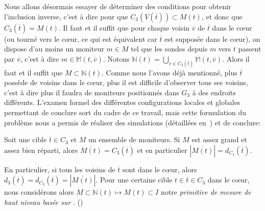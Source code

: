 Nous allons désormais essayer de déterminer des conditions pour obtenir
l'inclusion inverse, c'est à dire pour que $C_3(V(\overline{t})) \subset M(t)$,
et donc que $C_3(\overline{t}) = M(t)$. Il faut et il suffit que pour chaque
voisin $\overline{v}$ de $\overline{t}$ dans le cœur (ou tourné vers le cœur,
ce qui est équivalent car $\overline{t}$ est supposée dans le cœur), on dispose
d'au moins un moniteur $m \in M$ tel que les sondes \traceroute depuis $m$ vers
$t$ passent par $\overline{v}$, c'est à dire $m \in \mathbb{M}(t,
\overline{v})$. Notons $\mathbb{N}(t) = \bigcup_{\overline{v} \in
C_3(\overline{t})} \mathbb{M}(t, \overline{v})$. Alors il faut et il suffit que
$M \subset \mathbb{N}(t)$. Comme nous l'avons déjà mentionné, plus
$\overline{t}$ possède de voisins dans le cœur, plus il est difficile \apriori
d'observer tous ses voisins, c'est à dire plus il faudra de moniteurs
positionnés dans $G_3$ à des endroits différents. L'examen formel des
différentes configurations locales et globales permettant de conclure sort du
cadre de ce travail, mais cette formulation du problème nous a permis de
réaliser des simulations (détaillées en~) et de
conclure:

\begin{hypothese}
Soit une cible $\overline{t} \in C_3$ et $M$ un ensemble de moniteurs. Si
$M$ est assez grand et assez bien réparti, alors $\overline{M(t)} =
C_3(\overline{t})$ et en particulier $|\overline{M(t)}| =
d_{C_3}(\overline{t})$.
\label{hyp:traceroute-many-to-one}
\end{hypothese}

En particulier, si tous les voisins de $\overline{t}$ sont dans le cœur, alors
$d_3(\overline{t}) = d_{C_3}(\overline{t}) = |\overline{M(t)}|$. Pour une
certaine cible $t \in \overline{t} \in C_3$ dans le cœur, nous considérons
alors $M \subset \mathbb{N}(t) \mapsto M(t) \subset I$ notre {\em primitive de
mesure de haut niveau basée sur \traceroute}. ()


